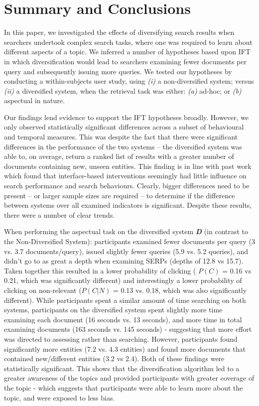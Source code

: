\section{Summary and Conclusions} \label{sec:conclusion}

In this paper, we investigated the effects of diversifying search results when searchers undertook complex search tasks, where one was required to learn about different aspects of a topic. We inferred a number of hypotheses based upon IFT in which diversification would lead to searchers examining fewer documents per query and subsequently issuing more queries. We tested our hypotheses by conducting a within-subjects user study, using \emph{(i)} a non-diversified system; versus \emph{(ii)} a diversified system, when the retrieval task was either: \emph{(a)} ad-hoc; or \emph{(b)} aspectual in nature.

Our findings lend evidence to support the IFT hypotheses broadly. However, we only observed statistically significant differences across a subset of behavioural and temporal measures. This was despite the fact that there were significant differences in the performance of the two systems -- the diversified system was able to, on average, return a ranked list of results with a greater number of documents containing new, unseen entities. This finding is in line with past work which found that interface-based interventions seemingly had little influence on search performance and search behaviours. Clearly, bigger differences need to be present -- or larger sample sizes are required -- to determine if the difference between systems over all examined indicators is significant. Despite these results, there were a number of clear trends.

When performing the aspectual task on the diversified system \textbf{\emph{D}} (in contrast to the Non-Diversified System):  participants examined fewer documents per query (3 vs. 3.7 documents/query), issued slightly fewer queries (5.9 vs. 5.2 queries), and didn't go to as great a depth when examining SERPs (depths of 12.8 vs 15.7). Taken together this resulted in a lower probability of clicking ( $P(C)$ = 0.16 vs 0.21, which was significantly different) and interestingly a lower probability of clicking on non-relevant ($P(C|N)$ = 0.13 vs. 0.18, which was also significantly different). While participants spent a similar amount of time searching on both systems, participants on the diversified system spent slightly more time examining each document (16 seconds vs. 13 seconds), and more time in total examining documents (163 seconds vs. 145 seconds) - suggesting that more effort was directed to assessing rather than searching. However, participants found significantly more entities (7.2 vs. 4.3 entities) and found more documents that contained new/different entities (3.2 vs 2.4). Both of these findings were statistically significant. This shows that the diversification algorithm led to a greater awareness of the topics and provided participants with greater coverage of the topic - which suggests that participants were able to learn more about the topic, and were exposed to less bias.

